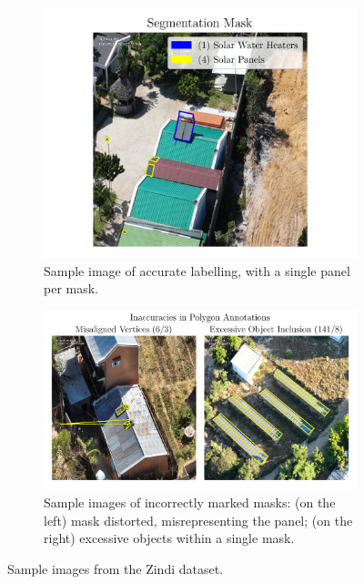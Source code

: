\documentclass[conference]{IEEEtran}
\begin{document}
\begin{figure}[H]
    \centering
    \begin{subfigure}[b]{\linewidth}
        \centering
        \includegraphics[width=\linewidth]{assets/data_segmentation_mask.png}
        \caption{Sample image of accurate labelling, with a single panel per mask.}
        \label{fig:data_segmentation_mask}
    \end{subfigure}

    \begin{subfigure}[b]{\linewidth}
        \centering
        \includegraphics[width=\linewidth]{assets/data_poly_problems.png}
        \caption{Sample images of incorrectly marked masks: (on the left) mask distorted, misrepresenting the panel; (on the right) excessive objects within a single mask.}
        \label{fig:data_poly_problems}
    \end{subfigure}
    \caption{Sample images from the Zindi dataset.}
    \label{fig:combined_segmentation_poly_issues}
\end{figure}
\end{document}
